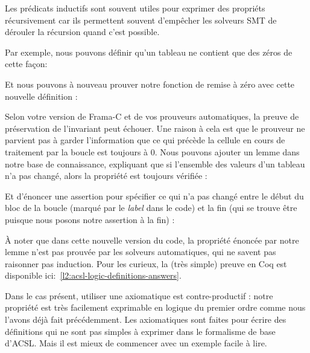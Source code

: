Les prédicats inductifs sont souvent utiles pour exprimer des propriéts récursivement
car ils permettent souvent d'empêcher les solveurs SMT de dérouler la récursion quand
c'est possible.


Par exemple, nous pouvons définir qu'un tableau ne contient que des zéros de cette
façon:




Et nous pouvons à nouveau prouver notre fonction de remise à zéro avec cette
nouvelle définition :






Selon votre version de Frama-C et de vos prouveurs automatiques, la preuve de
préservation de l'invariant peut échouer. Une raison à cela est que le prouveur ne
parvient pas à garder l'information que ce qui précède la cellule en cours de
traitement par la boucle est toujours à 0. Nous pouvons ajouter un lemme dans
notre base de connaissance, expliquant que si l'ensemble des valeurs d'un tableau
n'a pas changé, alors la propriété est toujours vérifiée :






Et d'énoncer une assertion pour spécifier ce qui n'a pas changé entre le début
du bloc de la boucle (marqué par le \textit{label}  dans le code) et la fin (qui se
trouve être  puisque nous posons notre assertion à la fin) :






À noter que dans cette nouvelle version du code, la propriété énoncée par notre
lemme n'est pas prouvée par les solveurs automatiques, qui ne savent pas raisonner
pas induction. Pour les curieux, la (très simple) preuve en Coq est disponible
ici:~\ref{l2:acsl-logic-definitions-answers}.



Dans le cas présent, utiliser une axiomatique est contre-productif : notre
propriété est très facilement exprimable en logique du premier ordre comme
nous l'avons déjà fait précédemment. Les axiomatiques sont faites pour écrire
des définitions qui ne sont pas simples à exprimer dans le formalisme de base
d'ACSL. Mais il est mieux de commencer avec un exemple facile à lire.




